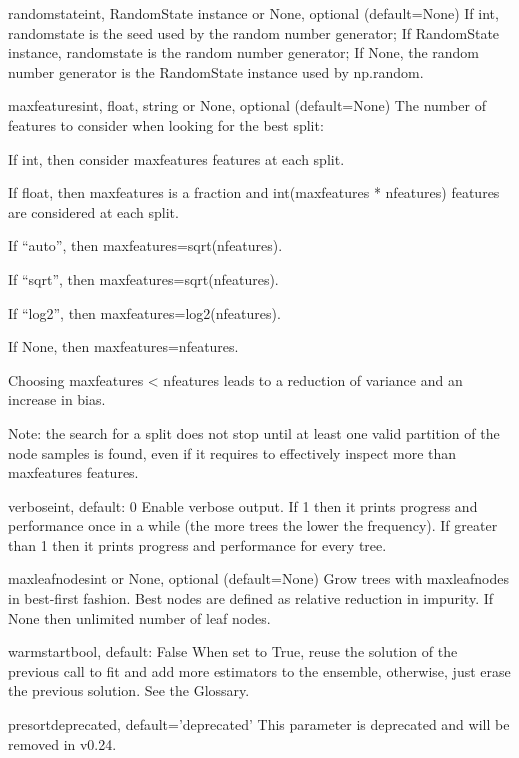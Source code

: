 \documentclass[12pt]{article}
\begin{document}
\begin{itemize}
random\textunderscore stateint, RandomState instance or None, optional (default=None)
If int, random\textunderscore state is the seed used by the random number generator; If RandomState instance, random\textunderscore state is the random number generator; If None, the random number generator is the RandomState instance used by np.random.

max\textunderscore featuresint, float, string or None, optional (default=None)
The number of features to consider when looking for the best split:

If int, then consider max\textunderscore features features at each split.

If float, then max\textunderscore features is a fraction and int(max\textunderscore features * n\textunderscore features) features are considered at each split.

If “auto”, then max\textunderscore features=sqrt(n\textunderscore features).

If “sqrt”, then max\textunderscore features=sqrt(n\textunderscore features).

If “log2”, then max\textunderscore features=log2(n\textunderscore features).

If None, then max\textunderscore features=n\textunderscore features.

Choosing max\textunderscore features < n\textunderscore features leads to a reduction of variance and an increase in bias.

Note: the search for a split does not stop until at least one valid partition of the node samples is found, even if it requires to effectively inspect more than max\textunderscore features features.

verboseint, default: 0
Enable verbose output. If 1 then it prints progress and performance once in a while (the more trees the lower the frequency). If greater than 1 then it prints progress and performance for every tree.

max\textunderscore leaf\textunderscore nodesint or None, optional (default=None)
Grow trees with max\textunderscore leaf\textunderscore nodes in best-first fashion. Best nodes are defined as relative reduction in impurity. If None then unlimited number of leaf nodes.

warm\textunderscore startbool, default: False
When set to True, reuse the solution of the previous call to fit and add more estimators to the ensemble, otherwise, just erase the previous solution. See the Glossary.

presortdeprecated, default=’deprecated’
This parameter is deprecated and will be removed in v0.24.


\end{itemize}
\end{document}
